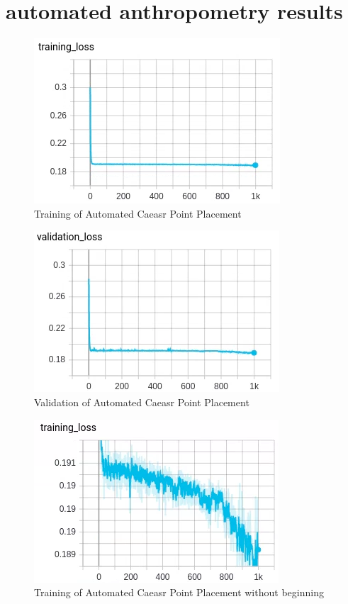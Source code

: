 \section{automated anthropometry results}

\begin{figure}[h]
	\caption{Training of Automated Caeasr Point Placement}
	\centering
\includegraphics{images/training.png}
\end{figure}
\begin{figure}[h]
	\caption{Validation of Automated Caeasr Point Placement}
	\centering
\includegraphics{images/validation.png}
\end{figure}
 \begin{figure}[h]
	\caption{Training of Automated Caeasr Point Placement without beginning}
	\centering
\includegraphics{images/train_close.png}
\end{figure}
